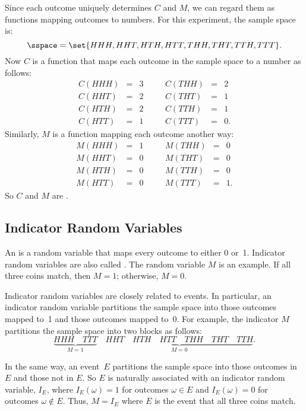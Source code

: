 Since each outcome uniquely determines $C$ and $M$, we can regard them
as functions mapping outcomes to numbers.  For this experiment, the
sample space is:
\[
\sspace  =  \set{ HHH, HHT, HTH, HTT, THH, THT, TTH, TTT }.
\]
Now $C$ is a function that maps each outcome in the sample space to a 
number as follows:
\[
\begin{array}{rclcrcl}
C(HHH) & = & 3 & \quad & C(THH) & = & 2 \\
C(HHT) & = & 2 & \quad & C(THT) & = & 1 \\
C(HTH) & = & 2 & \quad & C(TTH) & = & 1 \\
C(HTT) & = & 1 & \quad & C(TTT) & = & 0.
\end{array}
\]
Similarly, $M$ is a function mapping each outcome another way:
\[
\begin{array}{rclcrcl}
M(HHH) & = & 1 & \quad & M(THH) & = & 0 \\
M(HHT) & = & 0 & \quad & M(THT) & = & 0 \\
M(HTH) & = & 0 & \quad & M(TTH) & = & 0 \\
M(HTT) & = & 0 & \quad & M(TTT) & = & 1.
\end{array}
\]
So $C$ and $M$ are .

\subsection{Indicator Random Variables}

An  is a random variable that maps
every outcome to either 0 or~1.  Indicator random variables are also
called .  The random variable $M$ is an
example.  If all three coins match, then $M=1$; otherwise, $M = 0$.

Indicator random variables are closely related to events.  In
particular, an indicator random variable partitions the sample space
into those outcomes mapped to~1 and those outcomes mapped to~0.  For
example, the indicator $M$ partitions the sample space into two blocks
as follows:
\[
\underbrace{HHH \quad TTT}_{\text{$M = 1$}} \quad
\underbrace{HHT \quad HTH \quad HTT \quad
        THH \quad THT \quad TTH}_{\text{$M = 0$}}.
\]

In the same way, an event~$E$ partitions the sample space into those
outcomes in $E$ and those not in $E$.  So $E$ is naturally associated
with an indicator random variable,  $I_E$, where $I_E(\omega) = 1$ for outcomes $\omega \in E$ and
$I_E(\omega) = 0$ for outcomes $\omega \notin E$.  Thus, $M=I_E$ where
$E$ is the event that all three coins match.

